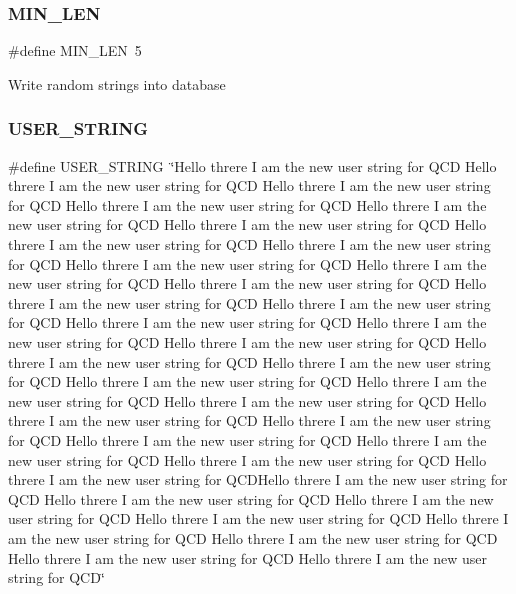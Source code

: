\mbox{\label{adat-devel_2other__libs_2filedb_2filehash_2twrite_8c_aa69f8dba9add1a52ce3cf7bcfafcfda0}} 
\subsubsection{\texorpdfstring{MIN\_LEN}{MIN\_LEN}}
{\footnotesize\ttfamily \#define M\+I\+N\+\_\+\+L\+EN~5}

Write random strings into database \mbox{\label{adat-devel_2other__libs_2filedb_2filehash_2twrite_8c_a5fdc86a0c07ccece3ef65e2f46c0ffd4}} 
\subsubsection{\texorpdfstring{USER\_STRING}{USER\_STRING}}
{\footnotesize\ttfamily \#define U\+S\+E\+R\+\_\+\+S\+T\+R\+I\+NG~\char`\"{}Hello threre I am the new user string for Q\+CD Hello threre I am the new user string for Q\+CD Hello threre I am the new user string for Q\+CD Hello threre I am the new user string for Q\+CD Hello threre I am the new user string for Q\+CD Hello threre I am the new user string for Q\+CD Hello threre I am the new user string for Q\+CD Hello threre I am the new user string for Q\+CD Hello threre I am the new user string for Q\+CD Hello threre I am the new user string for Q\+CD Hello threre I am the new user string for Q\+CD Hello threre I am the new user string for Q\+CD Hello threre I am the new user string for Q\+CD Hello threre I am the new user string for Q\+CD Hello threre I am the new user string for Q\+CD Hello threre I am the new user string for Q\+CD Hello threre I am the new user string for Q\+CD Hello threre I am the new user string for Q\+CD Hello threre I am the new user string for Q\+CD Hello threre I am the new user string for Q\+CD Hello threre I am the new user string for Q\+CD Hello threre I am the new user string for Q\+CD Hello threre I am the new user string for Q\+CD Hello threre I am the new user string for Q\+CD Hello threre I am the new user string for Q\+CD Hello threre I am the new user string for Q\+CD Hello threre I am the new user string for Q\+C\+D\+Hello threre I am the new user string for Q\+CD  Hello threre I am the new user string for Q\+CD Hello threre I am the new user string for Q\+CD Hello threre I am the new user string for Q\+CD Hello threre I am the new user string for Q\+CD Hello threre I am the new user string for Q\+CD Hello threre I am the new user string for Q\+CD Hello threre I am the new user string for Q\+CD\char`\"{}}



